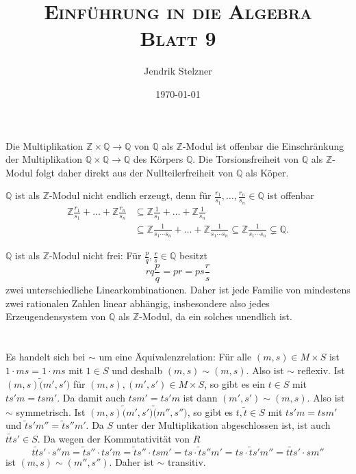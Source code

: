 \documentclass[a4paper,10pt]{article}
\title{\textsc{Einführung in die Algebra \\ \Large Blatt 9}}
\author{Jendrik Stelzner}
\date{\today}
\theoremstyle{definition}
\newcommand{\Z}{\mathbb{Z}}
\newcommand{\Q}{\mathbb{Q}}
\begin{document}
\maketitle





\section{}
Die Multiplikation $\Z \times \Q \rightarrow \Q$ von $\Q$ als $\Z$-Modul ist offenbar die Einschränkung der Multiplikation $\Q \times \Q \rightarrow \Q$ des Körpers $\Q$. Die Torsionsfreiheit von $\Q$ als $\Z$-Modul folgt daher direkt aus der Nullteilerfreiheit von $\Q$ als Köper.

$\Q$ ist als $\Z$-Modul nicht endlich erzeugt, denn für $\frac{r_1}{s_1}, \ldots, \frac{r_n}{s_n} \in \Q$ ist offenbar
\begin{align*}
 \Z \frac{r_1}{s_1} + \ldots + \Z \frac{r_n}{s_n}
 &\subseteq \Z \frac{1}{s_1} + \ldots + \Z \frac{1}{s_n} \\
 &\subseteq \Z \frac{1}{s_1 \cdots s_n} + \ldots + \Z \frac{1}{s_1 \cdots s_n} 
 \subseteq \Z \frac{1}{s_1 \cdots s_n}
 \subsetneq \Q.
\end{align*}


$\Q$ ist als $\Z$-Modul nicht frei: Für $\frac{p}{q}, \frac{r}{s} \in \Q$ besitzt
\[
 rq \frac{p}{q} = pr = ps \frac{r}{s}
\]
zwei unterschiedliche Linearkombinationen. Daher ist jede Familie von mindestens zwei rationalen Zahlen linear abhängig, insbesondere also jedes Erzeugendensystem von $\Q$ als $\Z$-Modul, da ein solches unendlich ist.





\section{}


\subsection{}
Es handelt sich bei $\sim$ um eine Äquivalenzrelation: Für  alle $(m,s) \in M \times S$ ist \mbox{$1 \cdot ms = 1 \cdot ms$} mit $1 \in S$ und deshalb $(m,s) \sim (m,s)$. Also ist $\sim$ reflexiv. Ist $(m,s) \tilde (m', s')$ für $(m,s), (m',s') \in M \times S$, so gibt es ein $t \in S$ mit $ts'm = tsm'$. Da damit auch $tsm' = ts'm$ ist dann $(m',s') \sim (m,s)$. Also ist $\sim$ symmetrisch. Ist $(m,s) \tilde (m',s') \tilde (m'', s'')$, so gibt es $t, \tilde{t} \in S$ mit $ts'm = tsm'$ und $\tilde{t}s'm'' = \tilde{t}s''m'$. Da $S$ unter der Multiplikation abgeschlossen ist, ist auch $t\tilde{t}s' \in S$. Da wegen der Kommutativität von $R$
\[
 t\tilde{t}s' \cdot s''m
 = \tilde{t}s'' \cdot ts'm
 = \tilde{t}s'' \cdot tsm'
 = ts \cdot \tilde{t}s''m'
 = ts \cdot \tilde{t}s'm''
 = t\tilde{t}s' \cdot sm''
\]
ist $(m,s) \sim (m'',s'')$. Daher ist $\sim$ transitiv.
\end{document}
